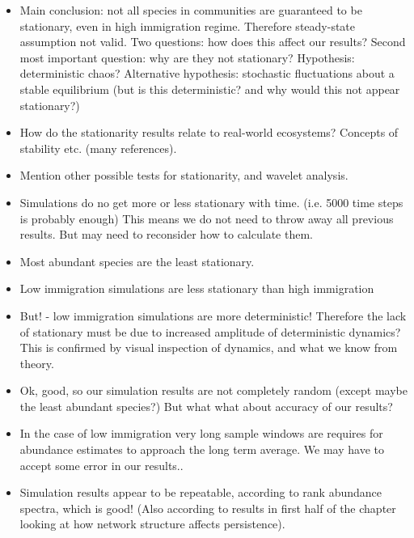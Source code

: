\begin{itemize}
	\item Main conclusion: not all species in communities are guaranteed to be stationary, even in high immigration regime. Therefore steady-state assumption not valid. Two questions: how does this affect our results?  Second most important question: why are they not stationary? Hypothesis: deterministic chaos? Alternative hypothesis: stochastic fluctuations about a stable equilibrium (but is this deterministic? and why would this not appear stationary?) 
	
	\item How do the stationarity results relate to real-world ecosystems? Concepts of stability etc. (many references).

	\item Mention other possible tests for stationarity, and wavelet analysis.
	
	\item Simulations do no get more or less stationary with time. (i.e. 5000 time steps is probably enough) This means we do not need to throw away all previous results. But may need to reconsider how to calculate them.
	
	\item Most abundant species are the least stationary. 
	\item Low immigration simulations are less stationary than high immigration
	
	\item But! - low immigration simulations are more deterministic! Therefore the lack of stationary must be due to increased amplitude of deterministic dynamics? This is confirmed by visual inspection of dynamics, and what we know from theory.
	
	\item Ok, good, so our simulation results are not completely random (except maybe the least abundant species?) But what what about accuracy of our results?
	
	\item In the case of low immigration very long sample windows are requires for abundance estimates to approach the long term average. We may have to accept some error in our results..
	
	\item Simulation results appear to be repeatable, according to rank abundance spectra, which is good! (Also according to results in first half of the chapter looking at how network structure affects persistence).
\end{itemize}



